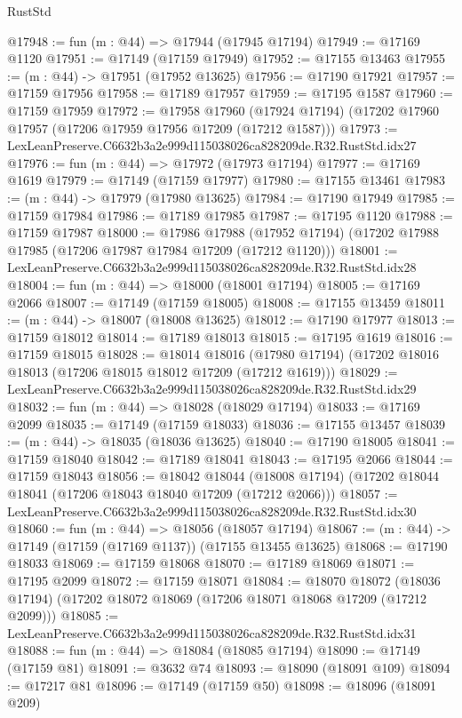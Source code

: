 \begin{lexlean}{RustStd}
\begin{coremodule}
@17948 := fun (m : @44) => @17944 (@17945 @17194)
@17949 := @17169 @1120
@17951 := @17149 (@17159 @17949)
@17952 := @17155 @13463
@17955 := (m : @44) -> @17951 (@17952 @13625)
@17956 := @17190 @17921
@17957 := @17159 @17956
@17958 := @17189 @17957
@17959 := @17195 @1587
@17960 := @17159 @17959
@17972 := @17958
    @17960
    (@17924 @17194)
    (@17202 @17960 @17957 (@17206 @17959 @17956 @17209 (@17212 @1587)))
@17973 := LexLeanPreserve.C6632b3a2e999d115038026ca828209de.R32.RustStd.idx27
@17976 := fun (m : @44) => @17972 (@17973 @17194)
@17977 := @17169 @1619
@17979 := @17149 (@17159 @17977)
@17980 := @17155 @13461
@17983 := (m : @44) -> @17979 (@17980 @13625)
@17984 := @17190 @17949
@17985 := @17159 @17984
@17986 := @17189 @17985
@17987 := @17195 @1120
@17988 := @17159 @17987
@18000 := @17986
    @17988
    (@17952 @17194)
    (@17202 @17988 @17985 (@17206 @17987 @17984 @17209 (@17212 @1120)))
@18001 := LexLeanPreserve.C6632b3a2e999d115038026ca828209de.R32.RustStd.idx28
@18004 := fun (m : @44) => @18000 (@18001 @17194)
@18005 := @17169 @2066
@18007 := @17149 (@17159 @18005)
@18008 := @17155 @13459
@18011 := (m : @44) -> @18007 (@18008 @13625)
@18012 := @17190 @17977
@18013 := @17159 @18012
@18014 := @17189 @18013
@18015 := @17195 @1619
@18016 := @17159 @18015
@18028 := @18014
    @18016
    (@17980 @17194)
    (@17202 @18016 @18013 (@17206 @18015 @18012 @17209 (@17212 @1619)))
@18029 := LexLeanPreserve.C6632b3a2e999d115038026ca828209de.R32.RustStd.idx29
@18032 := fun (m : @44) => @18028 (@18029 @17194)
@18033 := @17169 @2099
@18035 := @17149 (@17159 @18033)
@18036 := @17155 @13457
@18039 := (m : @44) -> @18035 (@18036 @13625)
@18040 := @17190 @18005
@18041 := @17159 @18040
@18042 := @17189 @18041
@18043 := @17195 @2066
@18044 := @17159 @18043
@18056 := @18042
    @18044
    (@18008 @17194)
    (@17202 @18044 @18041 (@17206 @18043 @18040 @17209 (@17212 @2066)))
@18057 := LexLeanPreserve.C6632b3a2e999d115038026ca828209de.R32.RustStd.idx30
@18060 := fun (m : @44) => @18056 (@18057 @17194)
@18067 := (m : @44) -> @17149 (@17159 (@17169 @1137)) (@17155 @13455 @13625)
@18068 := @17190 @18033
@18069 := @17159 @18068
@18070 := @17189 @18069
@18071 := @17195 @2099
@18072 := @17159 @18071
@18084 := @18070
    @18072
    (@18036 @17194)
    (@17202 @18072 @18069 (@17206 @18071 @18068 @17209 (@17212 @2099)))
@18085 := LexLeanPreserve.C6632b3a2e999d115038026ca828209de.R32.RustStd.idx31
@18088 := fun (m : @44) => @18084 (@18085 @17194)
@18090 := @17149 (@17159 @81)
@18091 := @3632 @74
@18093 := @18090 (@18091 @109)
@18094 := @17217 @81
@18096 := @17149 (@17159 @50)
@18098 := @18096 (@18091 @209)

\end{coremodule}
\end{lexlean}
